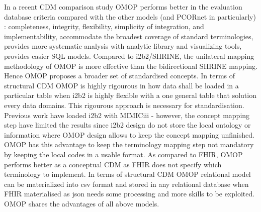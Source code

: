 
In a recent CDM comparison study \cite{cdm-review,omop-vs-pcornet} OMOP
performs better in the evaluation database criteria compared with the other
models (and PCORnet in particularly) : completeness, integrity, flexibility,
simplicity of integration, and implementability, accommodate the broadest
coverage of standard terminologies, provides more systematic analysis with
analytic library and visualizing tools, provides easier SQL models.
Compared to i2b2/SHRINE, the unilateral mapping methodology of OMOP is more
effective than the bidirectional \cite{shrine-design} SHRINE mapping. Hence
OMOP proposes a broader set of standardised concepts. In terms of structural
CDM OMOP is highly rigourous in how data shall be loaded in a particular table
when i2b2 is highly flexible with a one general table that solution every data
domains. This rigourous approach is necessary for standardisation. Previous
work have loaded i2b2 with MIMICiii \cite{mimic-i2b2} - however, the concept
mapping step have limited the results since i2b2 design do not store the local
ontology or information where OMOP design allows to keep the concept mapping
unfinished. OMOP has this advantage to keep the terminology mapping step not
mandatory by keeping the local codes in a usable format.
As compared to FHIR, OMOP performs better as a conceptual CDM as FHIR does not
specify which terminology to implement. In terms of structural CDM OMOP
relational model can be materialized into csv format and stored in any
relational database when FHIR materialised as json needs some processing and
more skills to be exploited. OMOP shares the advantages of all above models. 
\\



